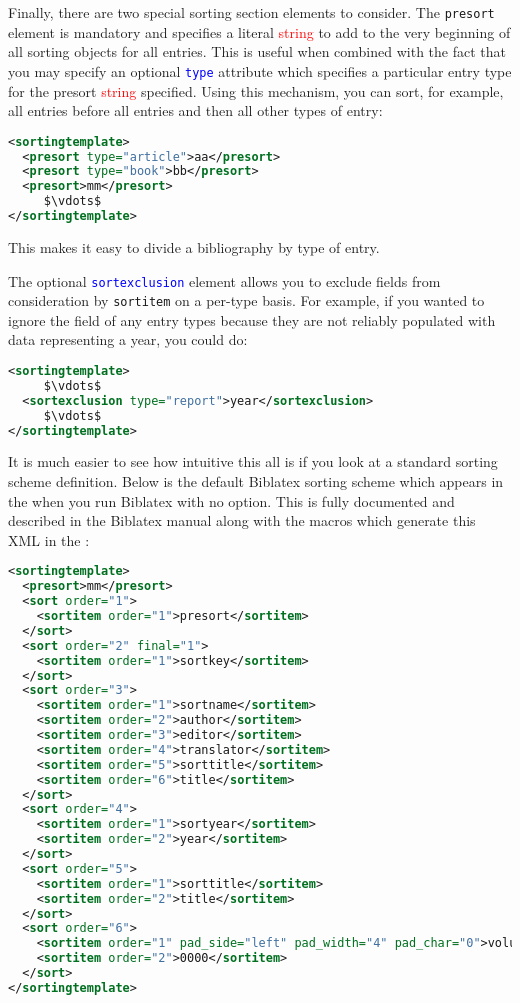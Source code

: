 \documentclass{ltxdockit}
\newcommand*{\biblatex}{Biblatex\xspace}
\begin{document}
Finally, there are two special sorting section elements to consider. The
\texttt{presort} element is mandatory and specifies a literal \textcolor{red}{string} to add
to the very beginning of all sorting objects for all entries. This is useful
when combined with the fact that you may specify an optional
\textcolor{blue}{\texttt{type}} attribute which specifies a particular
entry type for the presort \textcolor{red}{string} specified. Using this
mechanism, you can sort, for example, all  entries before
all  entries and then all other types of entry:

\begin{lstlisting}[language=xml,escapechar=+,mathescape=true]
<sortingtemplate>
  <presort type="article">aa</presort>
  <presort type="book">bb</presort>
  <presort>mm</presort>
     $\vdots$
</sortingtemplate>
\end{lstlisting}
%
This makes it easy to divide a bibliography by type of entry.

The optional \textcolor{blue}{\texttt{sortexclusion}} element allows you to
exclude fields from consideration by \texttt{sortitem} on a per-type basis.
For example, if you wanted to ignore the  field of any
 entry types because they are not reliably populated with
data representing a year, you could do:

\begin{lstlisting}[language=xml,escapechar=+,mathescape=true]
<sortingtemplate>
     $\vdots$
  <sortexclusion type="report">year</sortexclusion>
     $\vdots$
</sortingtemplate>
\end{lstlisting}
%
It is much easier to see how intuitive this all is if you look at a
standard sorting scheme definition. Below is the default \biblatex sorting
scheme which appears in the  when you run \biblatex with no
 option. This is fully documented and described in the
\biblatex manual along with the \latex macros which generate this XML in
the :

\begin{lstlisting}[language=xml,escapechar=+,mathescape=true]
<sortingtemplate>
  <presort>mm</presort>
  <sort order="1">
    <sortitem order="1">presort</sortitem>
  </sort>
  <sort order="2" final="1">
    <sortitem order="1">sortkey</sortitem>
  </sort>
  <sort order="3">
    <sortitem order="1">sortname</sortitem>
    <sortitem order="2">author</sortitem>
    <sortitem order="3">editor</sortitem>
    <sortitem order="4">translator</sortitem>
    <sortitem order="5">sorttitle</sortitem>
    <sortitem order="6">title</sortitem>
  </sort>
  <sort order="4">
    <sortitem order="1">sortyear</sortitem>
    <sortitem order="2">year</sortitem>
  </sort>
  <sort order="5">
    <sortitem order="1">sorttitle</sortitem>
    <sortitem order="2">title</sortitem>
  </sort>
  <sort order="6">
    <sortitem order="1" pad_side="left" pad_width="4" pad_char="0">volume</sortitem>
    <sortitem order="2">0000</sortitem>
  </sort>
</sortingtemplate>
\end{lstlisting}
\bigskip
\end{document}
